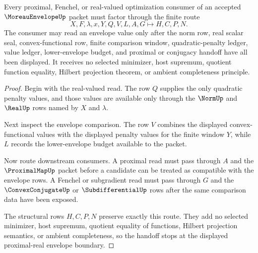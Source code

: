 \begin{theorem}
\label{thm:moreau-envelope-proximal-real-route}
Every proximal, Fenchel, or real-valued optimization consumer of an accepted $\MoreauEnvelopeUp$ packet must factor through the finite route
$$
X,F,\lambda,x,Y,Q,V,L,A,G \longmapsto H,C,P,N .
$$
The consumer may read an envelope value only after the norm row, real scalar seal, convex-functional row, finite comparison window, quadratic-penalty ledger, value ledger, lower-envelope budget, and proximal or conjugacy handoff have all been displayed. It receives no selected minimizer, host supremum, quotient function equality, Hilbert projection theorem, or ambient completeness principle.
\end{theorem}
\begin{proof}
Begin with the real-valued read. The row $Q$ supplies the only quadratic penalty values, and those values are available only through the $\NormUp$ and $\RealUp$ rows named by $X$ and $\lambda$.

Next inspect the envelope comparison. The row $V$ combines the displayed convex-functional values with the displayed penalty values for the finite window $Y$, while $L$ records the lower-envelope budget available to the packet.

Now route downstream consumers. A proximal read must pass through $A$ and the $\ProximalMapUp$ packet before a candidate can be treated as compatible with the envelope rows. A Fenchel or subgradient read must pass through $G$ and the $\ConvexConjugateUp$ or $\SubdifferentialUp$ rows after the same comparison data have been exposed.

The structural rows $H,C,P,N$ preserve exactly this route. They add no selected minimizer, host supremum, quotient equality of functions, Hilbert projection semantics, or ambient completeness, so the handoff stops at the displayed proximal-real envelope boundary.
\end{proof}



